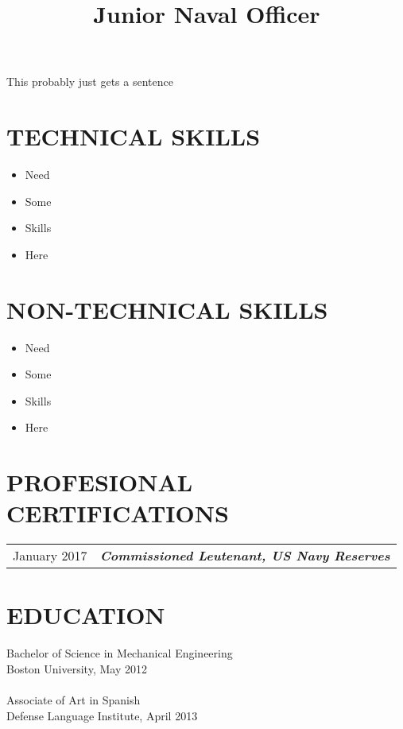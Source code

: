 \documentclass[line, margin]{resume}
\begin{document}
\begin{resume}
  \title{Junior Naval Officer}

  \begin{position}
    This probably just gets a sentence
  \end{position}

  
  \section{TECHNICAL SKILLS}
  \begin{itemize}
  \item Need
  \item Some
  \item Skills
  \item Here
  \end{itemize}
  
  \section{NON-TECHNICAL SKILLS}
  \begin{itemize}
  \item Need
  \item Some
  \item Skills
  \item Here
  \end{itemize}
  
  \section{PROFESIONAL CERTIFICATIONS}
  \begin{tabular}{l l}
    January 2017 & \textbf{\textit{Commissioned Leutenant, US Navy Reserves}} \\ [5pt]
  \end{tabular}
  
  \section{EDUCATION} 
  Bachelor of Science in Mechanical Engineering \\
  Boston University, May 2012 \\
  \\
  Associate of Art in Spanish \\
  Defense Language Institute, April 2013 \\
  
  
\end{resume}
\end{document}
